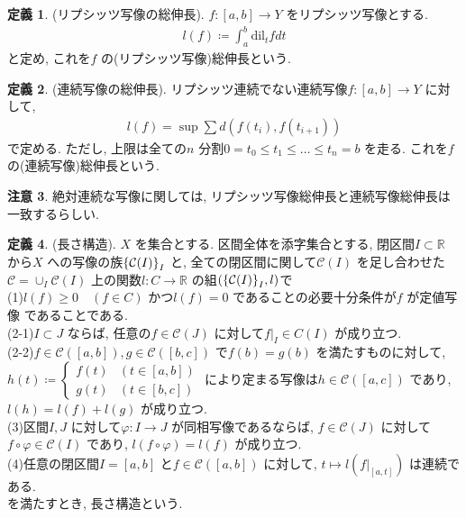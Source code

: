 \documentclass[platex, driver=dvipdfm, ja = standard, 10pt, fleqn, label-section=none]{bxjsarticle}
\theoremstyle{definition}
\newtheorem{dfn}{定義}[section]
\newtheorem{remark}[dfn]{注意}
\newcommand{\cbra}[1]{\mleft\{#1\mright\}}
\renewcommand{\;}{\, ; \,}
\begin{document}
\begin{dfn}(リプシッツ写像の総伸長). $f : [a, b] \rightarrow Y$ をリプシッツ写像とする. 
\begin{align*} l(f) \coloneqq \int_a^b \textrm{dil} _t f dt \end{align*} 
と定め, これを$f$ の(リプシッツ写像)総伸長という. 
\end{dfn}

\begin{dfn}(連続写像の総伸長). 
リプシッツ連続でない連続写像$f : [a, b] \rightarrow Y$ に対して, 
\begin{align*} l(f) = \sup \sum d(f(t_i), f(t_{i+1}))  \end{align*}
で定める. ただし, 上限は全ての$n$ 分割$0 = t_0 \leq t_1 \leq  \ldots \leq t_n = b $ を走る. これを$f$ の(連続写像)総伸長という.
\end{dfn}

\begin{remark}
絶対連続な写像に関しては, リプシッツ写像総伸長と連続写像総伸長は一致するらしい. 
\end{remark}



\begin{dfn}(長さ構造). $X$ を集合とする. 区間全体を添字集合とする, 閉区間$I \subset \mathbb R$ から$X$  への写像の族$\cbra{\mathcal C(I)}_I$ と, 全ての閉区間に関して$\mathcal C (I)$ を足し合わせた$\mathcal C = \cup_{I} \mathcal C (I)$ 上の関数$l: C \rightarrow \mathbb R$ の組$(\cbra{\mathcal C(I)}_I, l)$で\\
(1)$l(f) \geq0 \quad (f \in C)$ かつ$l(f) = 0$ であることの必要十分条件が$f$ が定値写像 であることである. \\
(2-1)$I \subset J $ ならば, 任意の$f \in \mathcal C(J)$ に対して$f |_I \in C(I)$ が成り立つ.  \\
(2-2)$f \in \mathcal C([a,b]), g \in \mathcal C([b,c])$ で$f(b) = g(b)$ を満たすものに対して, $h(t) \coloneqq \begin{cases} f(t) &(t \in [a,b]) \\ g(t) &(t \in [b,c])\end{cases} $ により定まる写像は$h \in \mathcal C([a,c])$ であり, $l(h) = l(f) + l(g)$ が成り立つ. \\
(3)区間$I, J$ に対して$\varphi : I \rightarrow J$ が同相写像であるならば, $f \in \mathcal C(J)$ に対して$f \circ \varphi \in \mathcal C(I)$ であり, $l(f\circ \varphi) = l(f)$ が成り立つ. \\
(4)任意の閉区間$I = [a, b]$ と$f \in \mathcal C([a,b])$ に対して, $t \mapsto l(f|_{[a, t]})$ は連続である. \\
を満たすとき, 長さ構造という. 

\end{dfn}
\end{document}
